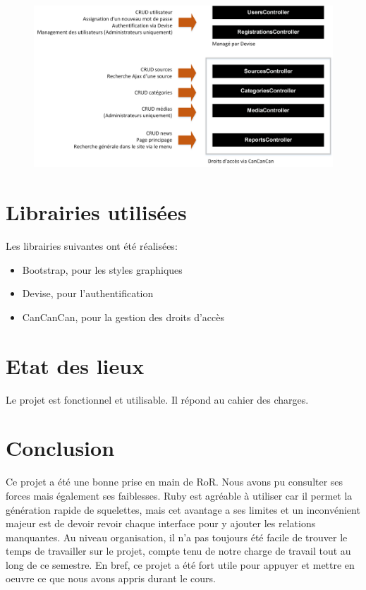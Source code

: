 \documentclass{article}
\begin{document}
\begin{figure}[h]
  \centering
  \includegraphics[width=14cm]{mvc}
\end{figure}

\section{Librairies utilisées}

Les librairies suivantes ont été réalisées:

\begin{itemize}
\item Bootstrap, pour les styles graphiques
\item Devise, pour l'authentification
\item CanCanCan, pour la gestion des droits d'accès
\end{itemize}

\section{Etat des lieux}

Le projet est fonctionnel et utilisable. Il répond au cahier des charges.

\section{Conclusion}

Ce projet a été une bonne prise en main de RoR. Nous avons pu consulter ses forces mais également ses faiblesses. Ruby est agréable à utiliser car il permet la génération rapide de squelettes, mais cet avantage a ses limites et un inconvénient majeur est de devoir revoir chaque interface pour y ajouter les relations manquantes. Au niveau organisation, il n'a pas toujours été facile de trouver le temps de travailler sur le projet, compte tenu de notre charge de travail tout au long de ce semestre. En bref, ce projet a été fort utile pour appuyer et mettre en oeuvre ce que nous avons appris durant le cours.

\printbibliography


\end{document}
